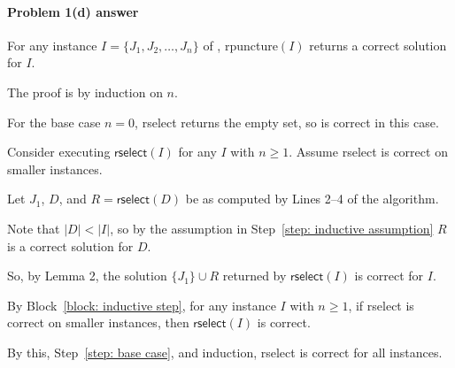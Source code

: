 
\paragraph{Problem 1(d) answer} 

\begin{theorem}
  For any instance $I=\{J_1, J_2, \ldots, J_n\}$ of ,
  \textsf{rpuncture}${(I)}$ returns a correct solution for $I$.
\end{theorem}


\begin{blue}
  
  \begin{longFormProof}

    \step The proof is by induction on $n$.

    \step\label{step: base case}
    For the base case $n=0$, \textsf{rselect} returns the empty set, so is correct in this case.

    \smallskip 

    \begin{block}\label{block: inductive step}

      \step\label{step: inductive assumption}
      Consider executing $\textsf{rselect}(I)$ for any $I$ with $n\ge 1$.
      Assume \textsf{rselect} is correct on smaller instances.

      \step Let $J_1$, $D$, and $R=\textsf{rselect}(D)$ be as computed by Lines 2--4 of the algorithm.

      \step Note that $|D|<|I|$,
      so by the assumption in Step~\ref{step: inductive assumption} $R$ is a correct solution for $D$.

      \step So, by Lemma 2, the solution $\{J_1\} \cup R$ returned by $\textsf{rselect}(I)$ is correct for $I$.

    \end{block}

    \smallskip 

    \step By Block~\ref{block: inductive step},
    for any instance $I$ with $n\ge 1$,
    if \textsf{rselect} is correct on smaller instances,
    then $\textsf{rselect} (I)$ is correct.

    \step By this, Step~\ref{step: base case}, and induction, \textsf{rselect} is correct for all instances.
  \end{longFormProof}

\end{blue}

